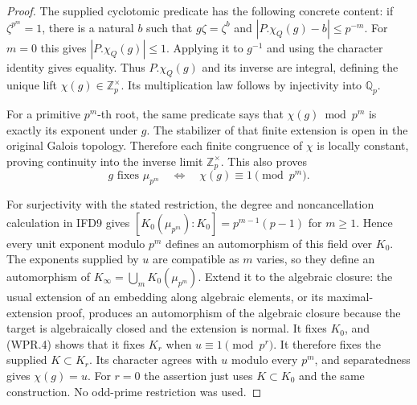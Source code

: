 \documentclass[11pt,a4paper]{article}
\numberwithin{equation}{section}
\theoremstyle{remark}\newtheorem{remark}[theorem]{Remark}
\begin{document}
\begin{proof}
The supplied cyclotomic predicate has the following concrete
content: if $\zeta^{p^m}=1$, there is a natural $b$ such that
$g\zeta=\zeta^b$ and $|P.\chi_Q(g)-b|\leq p^{-m}$.
For $m=0$ this gives $|P.\chi_Q(g)|\leq1$. Applying it to
$g^{-1}$ and using the character identity gives equality.
Thus $P.\chi_Q(g)$ and its inverse are integral, defining the
unique lift $\chi(g)\in\mathbb Z_p^\times$. Its multiplication
law follows by injectivity into $\mathbb Q_p$.

For a primitive $p^m$-th root, the same predicate says that
$\chi(g)\bmod p^m$ is exactly its exponent under $g$. The
stabilizer of that finite extension is open in the original
Galois topology. Therefore each finite congruence of $\chi$ is
locally constant, proving continuity into the inverse limit
$\mathbb Z_p^\times$. This also proves
\[
 g\text{ fixes }\mu_{p^m}
 \quad\Longleftrightarrow\quad \chi(g)\equiv1\pmod{p^m}.
 \tag{WPR.4}
\]

For surjectivity with the stated restriction, the degree and
noncancellation calculation in IFD9 gives
$[K_0(\mu_{p^m}):K_0]=p^{m-1}(p-1)$ for $m\geq1$.
Hence every unit exponent modulo $p^m$ defines an automorphism
of this field over $K_0$. The exponents supplied by $u$ are
compatible as $m$ varies, so they define an automorphism of
$K_\infty=\bigcup_mK_0(\mu_{p^m})$. Extend it to the algebraic
closure: the usual extension of an embedding along algebraic
elements, or its maximal-extension proof, produces an automorphism
of the algebraic closure because the target is algebraically closed
and the extension is normal. It fixes $K_0$, and (WPR.4) shows
that it fixes $K_r$ when $u\equiv1\pmod{p^r}$. It therefore fixes
the supplied $K\subset K_r$. Its character agrees with $u$
modulo every $p^m$, and separatedness gives $\chi(g)=u$.
For $r=0$ the assertion just uses $K\subset K_0$ and the same
construction. No odd-prime restriction was used.
\end{proof}

\end{document}
